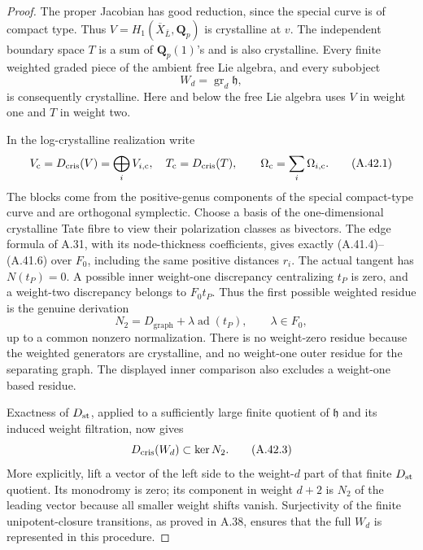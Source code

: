 \begin{proof}
The proper Jacobian has good reduction, since the special
curve is of compact type. Thus
\(V=H_1(\overline X_{\bar L},\mathbf Q_p)\) is
crystalline at \(v\). The independent boundary space
\(T\) is a sum of \(\mathbf Q_p(1)\)'s and is also
crystalline. Every finite weighted graded piece of the
ambient free Lie algebra, and every subobject
\[
                          W_d=\operatorname{gr}_d\mathfrak h,
\]
is consequently crystalline. Here and below the free Lie
algebra uses \(V\) in weight one and \(T\) in weight two.

In the log-crystalline realization write
\[
 V_{\rm c}=D_{\rm cris}(V)=\bigoplus_i V_{i,\rm c},
 \quad T_{\rm c}=D_{\rm cris}(T),\qquad
 \Omega_{\rm c}=\sum_i\Omega_{i,\rm c}.              \tag{A.42.1}
\]
The blocks come from the positive-genus components of the
special compact-type curve and are orthogonal symplectic.
Choose a basis of the one-dimensional crystalline Tate
fibre to view their polarization classes as bivectors.
The edge formula of A.31, with its node-thickness
coefficients, gives exactly (A.41.4)--(A.41.6) over
\(F_0\), including the same positive distances \(r_i\).
The actual tangent has \(N(t_P)=0\). A possible inner
weight-one discrepancy centralizing \(t_P\) is zero,
and a weight-two discrepancy belongs to
\(F_0t_P\). Thus the first possible weighted residue
is the genuine derivation
\[
                  N_2=D_{\mathrm{graph}}+
                                      \lambda\operatorname{ad}(t_P),
                         \qquad\lambda\in F_0,       \tag{A.42.2}
\]
up to a common nonzero normalization. There is no
weight-zero residue because the weighted generators
are crystalline, and no weight-one outer residue for
the separating graph. The displayed inner comparison
also excludes a weight-one based residue.

Exactness of \(D_{\rm st}\), applied to a sufficiently
large finite quotient of \(\mathfrak h\) and its
induced weight filtration, now gives
\[
                         D_{\rm cris}(W_d)\subset\ker N_2.
                                                               \tag{A.42.3}
\]
More explicitly, lift a vector of the left side to the
weight-\(d\) part of that finite \(D_{\rm st}\) quotient.
Its monodromy is zero; its component in weight \(d+2\)
is \(N_2\) of the leading vector because all smaller
weight shifts vanish. Surjectivity of the finite
unipotent-closure transitions, as proved in A.38, ensures
that the full \(W_d\) is represented in this procedure.


\end{proof}
